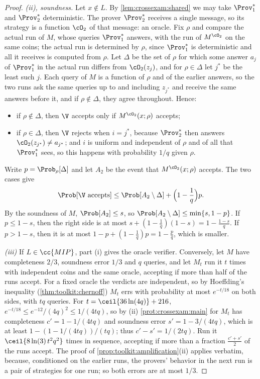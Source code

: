 \begin{refsection}
\begin{proof}
\emph{(ii), soundness.} Let $x\notin L$. By \cref{lem:crossexam:shared} we may take $\Prov_1^*$ and $\Prov_2^*$ deterministic. The prover $\Prov_2^*$ receives a single message, so its strategy is a function $\cO_2$ of that message: an oracle. Fix $\rho$ and compare the actual run of $M$, whose queries $\Prov_1^*$ answers, with the run of $M^{\cO_2}$ on the same coins; the actual run is determined by $\rho$, since $\Prov_1^*$ is deterministic and all it receives is computed from $\rho$. Let $\Delta$ be the set of $\rho$ for which some answer $a_j$ of $\Prov_1^*$ in the actual run differs from $\cO_2(z_j)$, and for $\rho\in\Delta$ let $j^*$ be the least such $j$. Each query of $M$ is a function of $\rho$ and of the earlier answers, so the two runs ask the same queries up to and including $z_{j^*}$ and receive the same answers before it, and if $\rho\notin\Delta$, they agree throughout. Hence:
\begin{itemize}
\item if $\rho\notin\Delta$, then $\V$ accepts only if $M^{\cO_2}(x;\rho)$ accepts;
\item if $\rho\in\Delta$, then $\V$ rejects when $i=j^*$, because $\Prov_2^*$ then answers $\cO_2(z_{j^*})\ne a_{j^*}$; and $i$ is uniform and independent of $\rho$ and of all that $\Prov_1^*$ sees, so this happens with probability $1/q$ given $\rho$.
\end{itemize}
Write $p=\Prob_\rho[\Delta]$ and let $A_2$ be the event that $M^{\cO_2}(x;\rho)$ accepts. The two cases give
\[
  \Prob[\V\text{ accepts}]\le\Prob[A_2\setminus\Delta]+\Bigl(1-\frac1q\Bigr)p.
\]
By the soundness of $M$, $\Prob[A_2]\le s$, so $\Prob[A_2\setminus\Delta]\le\min\{s,1-p\}$. If $p\le1-s$, then the right side is at most $s+(1-\frac1q)(1-s)=1-\frac{1-s}q$. If $p>1-s$, then it is at most $1-p+(1-\frac1q)p=1-\frac pq$, which is smaller.

\emph{(iii)} If $L\in\cc{MIP}$, part (i) gives the oracle verifier. Conversely, let $M$ have completeness $2/3$, soundness error $1/3$ and $q$ queries, and let $M_t$ run it $t$ times with independent coins and the same oracle, accepting if more than half of the runs accept. For a fixed oracle the verdicts are independent, so by Hoeffding's inequality (\cref{thm:toolkit:chernoff}) $M_t$ errs with probability at most $e^{-t/18}$ on both sides, with $tq$ queries. For $t=\ceil{36\ln(4q)}+216$, $e^{-t/18}\le e^{-12}/(4q)^2\le1/(4tq)$, so by (ii) \cref{prot:crossexam:main} for $M_t$ has completeness $c'=1-1/(4tq)$ and soundness error $s'=1-3/(4tq)$, which is at least $1-(1-1/(4tq))/(tq)$; thus $c'-s'=1/(2tq)$. Run it $\ceil{8\ln(3)\,t^2q^2}$ times in sequence, accepting if more than a fraction $\frac{c'+s'}2$ of the runs accept. The proof of \cref{prop:toolkit:amplification}(ii) applies verbatim, because, conditioned on the earlier runs, the provers' behavior in the next run is a pair of strategies for one run; so both errors are at most $1/3$.
\end{proof}


\end{refsection}
